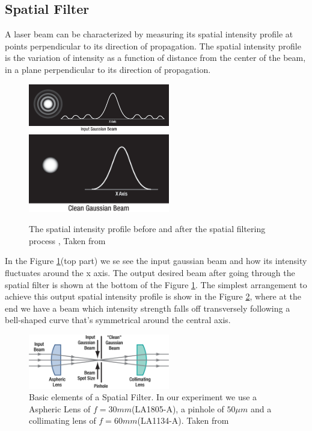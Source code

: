 \subsection{Spatial Filter}
A laser beam can be characterized by measuring its spatial intensity profile at points perpendicular to its direction of propagation. 
The spatial intensity profile is the variation of intensity as a function of distance from the center of the beam, in a plane perpendicular to its direction of propagation.
\begin{figure}[h!]
\centering
{  \includegraphics[width=0.55\textwidth]{Figures/inputBeam.png} }
{  \includegraphics[width=0.55\textwidth]{Figures/outputBeam.png} }
\caption{The spatial intensity profile before and after the spatial filtering process , Taken from \cite{thorlabs}}
 \label{fig:inputOutputBeam}
\end{figure}
In the Figure \ref{fig:inputOutputBeam}(top part) we se see the input gaussian beam 
and how its intensity fluctuates around the x axis. The output desired beam after going through the spatial filter is shown at the bottom 
of the Figure \ref{fig:inputOutputBeam}.
The simplest arrangement to achieve this output spatial intensity profile is show in the Figure \ref{fig:spatialFilter}, 
where at the end we have a beam which intensity strength falls off transversely following a bell-shaped curve that's symmetrical around the central axis.
\begin{figure}[h!]
\centering
\includegraphics[width=0.55\textwidth]{Figures/spatialFilter.png}
\caption{Basic elements of a Spatial Filter. In our experiment we use a Aspheric Lens of $f=30 mm$(LA1805-A), a pinhole of $50 \mu m$ and a collimating lens of $f=60 mm$(LA1134-A). Taken from \cite{thorlabs}} 
\label{fig:spatialFilter}
\end{figure}
